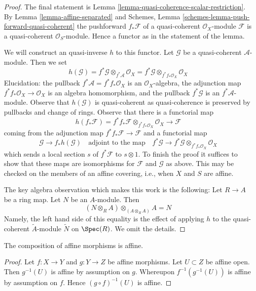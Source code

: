 \begin{proof}
The final statement is Lemma \ref{lemma-quasi-coherence-scalar-restriction}.
By Lemma \ref{lemma-affine-separated} and
Schemes, Lemma \ref{schemes-lemma-push-forward-quasi-coherent}
the pushforward $f_*\mathcal{F}$ of a quasi-coherent $\mathcal{O}_X$-module
$\mathcal{F}$
is a quasi-coherent $\mathcal{O}_S$-module. Hence a functor as in
the statement of the lemma.

\medskip\noindent
We will construct an quasi-inverse $h$ to this functor. Let $\mathcal{G}$
be a quasi-coherent $\mathcal{A}$-module. Then we set
$$
h(\mathcal{G}) = f^*\mathcal{G} \otimes_{f^*\mathcal{A}} \mathcal{O}_X =
f^*\mathcal{G} \otimes_{f^*f_*\mathcal{O}_X} \mathcal{O}_X
$$
Elucidation: the pullback $f^*\mathcal{A} = f^*f_*\mathcal{O}_X$
is an $\mathcal{O}_X$-algebra, the adjunction map
$f^*f_*\mathcal{O}_X \to \mathcal{O}_X$ is an algebra homomorphism, and
the pullback $f^*\mathcal{G}$ is an $f^*\mathcal{A}$-module. Observe that
$h(\mathcal{G})$ is quasi-coherent as quasi-coherence is preserved by
pullbacks and change of rings. Observe that there is a functorial map
$$
h(f_*\mathcal{F}) =
f^*f_*\mathcal{F} \otimes_{f^*f_*\mathcal{O}_X} \mathcal{O}_X \to \mathcal{F}
$$
coming from the adjunction map $f^*f_*\mathcal{F} \to \mathcal{F}$ and
a functorial map
$$
\mathcal{G} \to f_*h(\mathcal{G}) \quad\text{adjoint to the map}\quad
f^*\mathcal{G} \to f^*\mathcal{G} \otimes_{f^*f_*\mathcal{O}_X} \mathcal{O}_X
$$
which sends a local section $s$ of $f^*\mathcal{F}$ to $s \otimes 1$.
To finish the proof it suffices to show that these maps are isomorphisms
for $\mathcal{F}$ and $\mathcal{G}$ as above. This may be checked on the
members of an affine covering, i.e., when $X$ and $S$ are affine.

\medskip\noindent
The key algebra observation which makes this work is the
following: Let $R \to A$ be a ring map. Let $N$ be an $A$-module. Then
$$
(N \otimes_R A) \otimes_{(A \otimes_R A)} A = N
$$
Namely, the left hand side of this equality is the effect of applying
$h$ to the quasi-coherent $\widetilde{A}$-module $\widetilde{N}$ on $\Spec(R)$.
We omit the details.
\end{proof}

\begin{lemma}
\label{lemma-composition-affine}
The composition of affine morphisms is affine.
\end{lemma}

\begin{proof}
Let $f : X \to Y$ and $g : Y \to Z$ be affine morphisms.
Let $U \subset Z$ be affine open. Then $g^{-1}(U)$ is affine
by assumption on $g$. Whereupon $f^{-1}(g^{-1}(U))$ is affine
by assumption on $f$. Hence $(g \circ f)^{-1}(U)$ is affine.
\end{proof}

